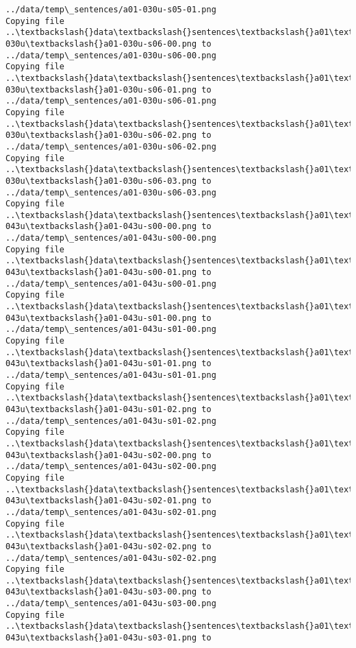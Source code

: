 \documentclass[11pt]{article}
\begin{document}
\begin{Verbatim}[commandchars=\\\{\}]
../data/temp\_sentences/a01-030u-s05-01.png
Copying file ..\textbackslash{}data\textbackslash{}sentences\textbackslash{}a01\textbackslash{}a01-030u\textbackslash{}a01-030u-s06-00.png to
../data/temp\_sentences/a01-030u-s06-00.png
Copying file ..\textbackslash{}data\textbackslash{}sentences\textbackslash{}a01\textbackslash{}a01-030u\textbackslash{}a01-030u-s06-01.png to
../data/temp\_sentences/a01-030u-s06-01.png
Copying file ..\textbackslash{}data\textbackslash{}sentences\textbackslash{}a01\textbackslash{}a01-030u\textbackslash{}a01-030u-s06-02.png to
../data/temp\_sentences/a01-030u-s06-02.png
Copying file ..\textbackslash{}data\textbackslash{}sentences\textbackslash{}a01\textbackslash{}a01-030u\textbackslash{}a01-030u-s06-03.png to
../data/temp\_sentences/a01-030u-s06-03.png
Copying file ..\textbackslash{}data\textbackslash{}sentences\textbackslash{}a01\textbackslash{}a01-043u\textbackslash{}a01-043u-s00-00.png to
../data/temp\_sentences/a01-043u-s00-00.png
Copying file ..\textbackslash{}data\textbackslash{}sentences\textbackslash{}a01\textbackslash{}a01-043u\textbackslash{}a01-043u-s00-01.png to
../data/temp\_sentences/a01-043u-s00-01.png
Copying file ..\textbackslash{}data\textbackslash{}sentences\textbackslash{}a01\textbackslash{}a01-043u\textbackslash{}a01-043u-s01-00.png to
../data/temp\_sentences/a01-043u-s01-00.png
Copying file ..\textbackslash{}data\textbackslash{}sentences\textbackslash{}a01\textbackslash{}a01-043u\textbackslash{}a01-043u-s01-01.png to
../data/temp\_sentences/a01-043u-s01-01.png
Copying file ..\textbackslash{}data\textbackslash{}sentences\textbackslash{}a01\textbackslash{}a01-043u\textbackslash{}a01-043u-s01-02.png to
../data/temp\_sentences/a01-043u-s01-02.png
Copying file ..\textbackslash{}data\textbackslash{}sentences\textbackslash{}a01\textbackslash{}a01-043u\textbackslash{}a01-043u-s02-00.png to
../data/temp\_sentences/a01-043u-s02-00.png
Copying file ..\textbackslash{}data\textbackslash{}sentences\textbackslash{}a01\textbackslash{}a01-043u\textbackslash{}a01-043u-s02-01.png to
../data/temp\_sentences/a01-043u-s02-01.png
Copying file ..\textbackslash{}data\textbackslash{}sentences\textbackslash{}a01\textbackslash{}a01-043u\textbackslash{}a01-043u-s02-02.png to
../data/temp\_sentences/a01-043u-s02-02.png
Copying file ..\textbackslash{}data\textbackslash{}sentences\textbackslash{}a01\textbackslash{}a01-043u\textbackslash{}a01-043u-s03-00.png to
../data/temp\_sentences/a01-043u-s03-00.png
Copying file ..\textbackslash{}data\textbackslash{}sentences\textbackslash{}a01\textbackslash{}a01-043u\textbackslash{}a01-043u-s03-01.png to

\end{Verbatim}
\end{document}
